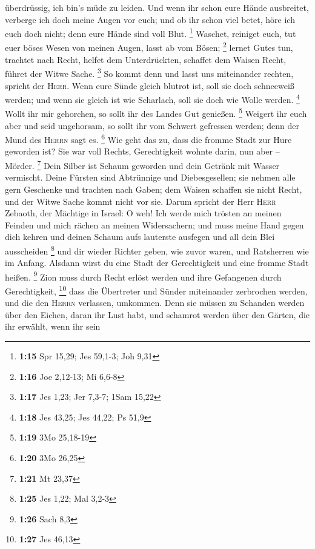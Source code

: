 überdrüssig, ich bin's müde zu leiden.  Und wenn ihr
schon eure Hände ausbreitet, verberge ich doch meine Augen vor euch; und
ob ihr schon viel betet, höre ich euch doch nicht; denn eure Hände sind
voll Blut. \footnote{\textbf{1:15} Spr 15,29; Jes 59,1-3; Joh 9,31}
 Waschet, reiniget euch, tut euer böses Wesen von meinen
Augen, lasst ab vom Bösen; \footnote{\textbf{1:16} Joe 2,12-13; Mi 6,6-8}
 lernet Gutes tun, trachtet nach Recht, helfet dem
Unterdrückten, schaffet dem Waisen Recht, führet der Witwe Sache.
\footnote{\textbf{1:17} Jes 1,23; Jer 7,3-7; 1Sam 15,22} 
So kommt denn und lasst uns miteinander rechten, spricht der
\textsc{Herr}. Wenn eure Sünde gleich blutrot ist, soll sie doch
schneeweiß werden; und wenn sie gleich ist wie Scharlach, soll sie doch
wie Wolle werden. \footnote{\textbf{1:18} Jes 43,25; Jes 44,22; Ps 51,9}
 Wollt ihr mir gehorchen, so sollt ihr des Landes Gut
genießen. \footnote{\textbf{1:19} 3Mo 25,18-19}  Weigert
ihr euch aber und seid ungehorsam, so sollt ihr vom Schwert gefressen
werden; denn der Mund des \textsc{Herrn} sagt es. \footnote{\textbf{1:20}
  3Mo 26,25}  Wie geht das zu, dass die fromme Stadt zur
Hure geworden ist? Sie war voll Rechts, Gerechtigkeit wohnte darin, nun
aber -- Mörder. \footnote{\textbf{1:21} Mt 23,37}  Dein
Silber ist Schaum geworden und dein Getränk mit Wasser vermischt.
 Deine Fürsten sind Abtrünnige und Diebesgesellen; sie
nehmen alle gern Geschenke und trachten nach Gaben; dem Waisen schaffen
sie nicht Recht, und der Witwe Sache kommt nicht vor sie.
 Darum spricht der Herr \textsc{Herr} Zebaoth, der
Mächtige in Israel: O weh! Ich werde mich trösten an meinen Feinden und
mich rächen an meinen Widersachern;  und muss meine Hand
gegen dich kehren und deinen Schaum aufs lauterste ausfegen und all dein
Blei ausscheiden \footnote{\textbf{1:25} Jes 1,22; Mal 3,2-3}
 und dir wieder Richter geben, wie zuvor waren, und
Ratsherren wie im Anfang. Alsdann wirst du eine Stadt der Gerechtigkeit
und eine fromme Stadt heißen. \footnote{\textbf{1:26} Sach 8,3}
 Zion muss durch Recht erlöst werden und ihre Gefangenen
durch Gerechtigkeit, \footnote{\textbf{1:27} Jes 46,13} 
dass die Übertreter und Sünder miteinander zerbrochen werden, und die
den \textsc{Herrn} verlassen, umkommen.  Denn sie müssen
zu Schanden werden über den Eichen, daran ihr Lust habt, und schamrot
werden über den Gärten, die ihr erwählt,  wenn ihr sein
